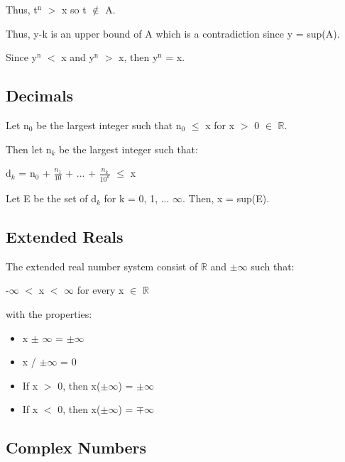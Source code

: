 	\qquad Thus, t$^\text{n}$ $>$ x so t $\not \in$ A.

	\qquad Thus, y-k is an upper bound of A which is a contradiction since y = sup(A).

	Since y$^\text{n}$ $<$ x and y$^\text{n}$ $>$ x, then y$^\text{n}$ = x. 

\newpage





\subsection{Decimals}

	Let n$_0$ be the largest integer such that n$_0$ $\leq$ x for x $>$ 0 $\in$ $\mathbb{R}$.

	Then let n$_k$ be the largest integer such that:

	\qquad d$_k$ = n$_0$ + $\frac{n_1}{10}$ + ... + $\frac{n_k}{10^k}$ $\leq$ x

	Let E be the set of d$_k$ for k = 0, 1, ... $\infty$. Then, x = sup(E).





\subsection{Extended Reals}

	The extended real number system consist of $\mathbb{R}$ and $\pm$$\infty$ such that:

	\qquad -$\infty$ $<$ x $<$ $\infty$	\qquad for every x $\in$ $\mathbb{R}$

	with the properties:
	\begin{itemize}[leftmargin=2cm]
		\item x $\pm$ $\infty$ = $\pm$$\infty$
	
		\item x / $\pm$$\infty$ = 0

		\item If x $>$ 0, then x($\pm$$\infty$) = $\pm$$\infty$

		\item If x $<$ 0, then x($\pm$$\infty$) = $\mp$$\infty$
	\end{itemize}





\subsection{Complex Numbers}

